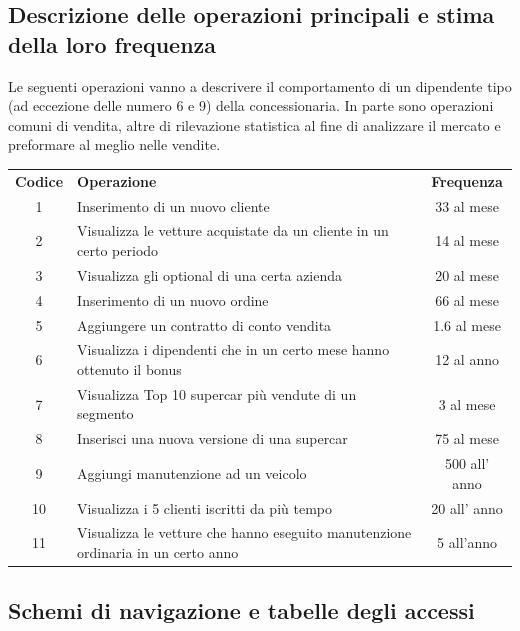 \documentclass[12pt]{article}
\begin{document}
\subsection{Descrizione delle operazioni principali e stima della loro frequenza}

Le seguenti operazioni vanno a descrivere il comportamento di un dipendente tipo
(ad eccezione delle numero 6 e 9) della concessionaria. In parte sono operazioni
comuni di vendita, altre di rilevazione statistica al fine di analizzare il
mercato e preformare al meglio nelle vendite. 

\begin{table}[htbp]
    \centering
    \small
    \begin{tabularx}{\linewidth}{c X c}
      \rowcolor{red!20!}
      \textbf{Codice} & \textbf{Operazione} & \textbf{Frequenza} \\
      1 & Inserimento di un nuovo cliente & 33 al mese \\
      2 & Visualizza le vetture acquistate da un cliente in un certo periodo & 14 al mese \\
      3 & Visualizza gli optional di una certa azienda & 20 al mese \\
      4 & Inserimento di un nuovo ordine & 66 al mese \\
      5 & Aggiungere un contratto di conto vendita & 1.6 al mese \\
      6 & Visualizza i dipendenti che in un certo mese hanno ottenuto il bonus &
      12 al anno \\
      7 & Visualizza Top 10 supercar più vendute di un segmento & 3 al mese \\
      8 & Inserisci una nuova versione di una supercar & 75 al mese \\
      9 & Aggiungi manutenzione ad un veicolo & 500 all' anno \\
      10 & Visualizza i 5 clienti iscritti da più tempo &  20 all' anno \\
      11 & Visualizza le vetture che hanno eseguito manutenzione ordinaria in un
      certo anno & 5 all'anno \\
    \end{tabularx}
    \label{tab:tabella_frequenze}
\end{table}
\subsection{Schemi di navigazione e tabelle degli accessi}
\end{document}
